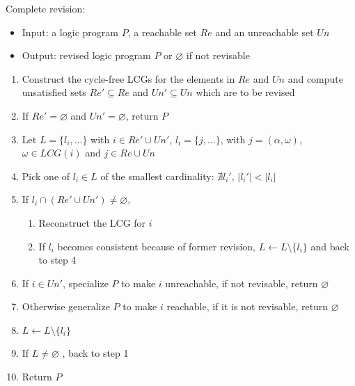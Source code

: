     \noindent
    \begin{minipage}{\linewidth}
    \vspace{1em}
    Complete revision:
    \begin{itemize}
        \item Input: a logic program $P$, a reachable set $Re$ and an unreachable set $Un$
        \item Output: revised logic program $P$ or $\varnothing$ if not revisable
    \end{itemize}
    \begin{enumerate}
        \item Construct the cycle-free LCGs for the elements in $Re$ and $Un$ and compute unsatisfied sets $Re'\subseteq Re$ and $Un'\subseteq Un$ which are to be revised
        \item If $Re'=\varnothing$ and $Un'=\varnothing$, return $P$
        \item Let $L=\{l_i,\ldots\}$ with $i\in Re' \cup Un'$, $l_i=\{j,\ldots\}$, with $j=(\alpha,\omega)$, $\omega \in LCG(i)$ and $ j\in Re\cup Un$ \label{step:dependency}
        \item Pick one of $l_i\in L$ of the smallest cardinality: $\nexists l_i'$, $|l_i'| < |l_i|$ \label{step:cardinality}
        \item If $l_i\cap (Re'\cup Un')\neq\varnothing$, \label{step:check}
        \begin{enumerate}
            \item Reconstruct the LCG for $i$
            \item If $l_i$ becomes consistent because of former revision, $L\gets L\setminus \{l_i\}$ and back to step 4
        \end{enumerate}
        \item If $i\in Un'$, specialize $P$ to make $i$ unreachable, if not revisable, return $\varnothing$ \label{step:specialize}
        \item Otherwise generalize $P$ to make $i$ reachable, if it is not revisable, return $\varnothing$ \label{step:generalize}
        
        \item $L\gets L\setminus\{l_i\}$ \label{step:update}
        \item If $L\neq\varnothing$ , back to step 1 \label{step:recheck}
        \item Return $P$
    \end{enumerate} 
    \vspace{0.1em}
    \end{minipage}
    
